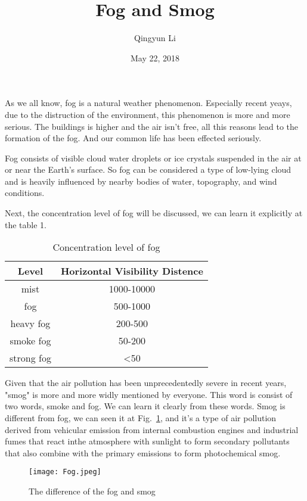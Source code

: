 \documentclass{article}
\author{Qingyun Li}
\date{May 22, 2018}
\title{Fog and Smog}
\begin{document}
\maketitle
 \par As we all know, fog is a natural weather phenomenon. Especially recent yeays, due to the distruction of the   environment, this phenomenon is more and more serious. The buildings is higher and the air isn't free, all this reasons lead to the formation of the fog. And our common life has been effected seriously. 
 \par Fog consists of visible cloud water droplets or ice crystals suspended in the air at or near the Earth's surface\cite{gultepe2008fog}. So fog can be considered a type of low-lying cloud and is heavily influenced by nearby bodies of water, topography, and wind conditions.
 \par Next, the concentration level of fog will be discussed, we can learn it explicitly at the table 1.
\begin{table}[htbp]
\centering
\caption{Concentration level of fog}
\begin{tabular}{c|c}
\hline
Level & Horizontal Visibility Distence \\
\hline
mist & 1000-10000 \\
fog & 500-1000 \\
heavy fog & 200-500 \\
smoke fog & 50-200 \\
strong fog & <50 \\
\hline 
\end{tabular} 
\end{table}
 \par Given that the air pollution has been unprecedentedly severe in recent years, "smog" is more and more widly mentioned by everyone. This word is consist of two words, smoke and fog. We can learn it clearly from these words. Smog is different from fog, we can seen it at Fig.~\ref{differnce}, and it's a type of air pollution derived from vehicular emission from internal combustion engines and industrial fumes that react inthe atmosphere with sunlight to form secondary pollutants that also combine with the primary emissions to form photochemical smog.
 \begin{figure}[htbp]
\begin{minipage}{1\linewidth}
\centering{}
\texttt{[image: Fog.jpeg]}\\
\caption{The difference of the fog and smog}\label{differnce}
\end{minipage}
\end{figure}


\end{document}
